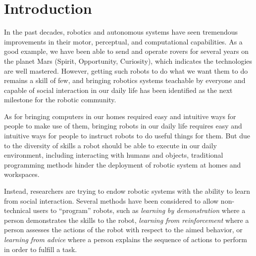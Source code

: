 
\chapter{Introduction}
\label{chapter:introduction}
\minitoc


In the past decades, robotics and autonomous systems have seen tremendous improvements in their motor, perceptual, and computational capabilities. As a good example, we have been able to send and operate rovers for several years on the planet Mars (Spirit, Opportunity, Curiosity), which indicates the technologies are well mastered. However, getting such robots to do what we want them to do remains a skill of few, and bringing robotics systems teachable by everyone and capable of social interaction in our daily life has been identified as the next milestone for the robotic community.

As for bringing computers in our homes required easy and intuitive ways for people to make use of them, bringing robots in our daily life requires easy and intuitive ways for people to instruct robots to do useful things for them. 
But due to the diversity of skills a robot should be able to execute in our daily environment, including interacting with humans and objects, traditional programming methods hinder the deployment of robotic system at homes and workspaces.

Instead, researchers are trying to endow robotic systems with the ability to learn from social interaction.
Several methods have been considered to allow non-technical users to ``program'' robots, such as \emph{learning by demonstration} where a person demonstrates the skills to the robot, \emph{learning from reinforcement} where a person assesses the actions of the robot with respect to the aimed behavior, or \emph{learning from advice} where a person explains the sequence of actions to perform in order to fulfill a task.


